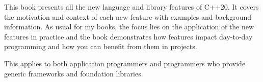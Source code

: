 This book presents all the new language and library features of C++20. It covers the motivation and context of each new feature with examples and background information.
As usual for my books, the focus lies on the application of the new features in practice and the book demonstrates how features impact day-to-day programming and how you can benefit from them in projects.

This applies to both application programmers and programmers who provide generic frameworks and foundation libraries.